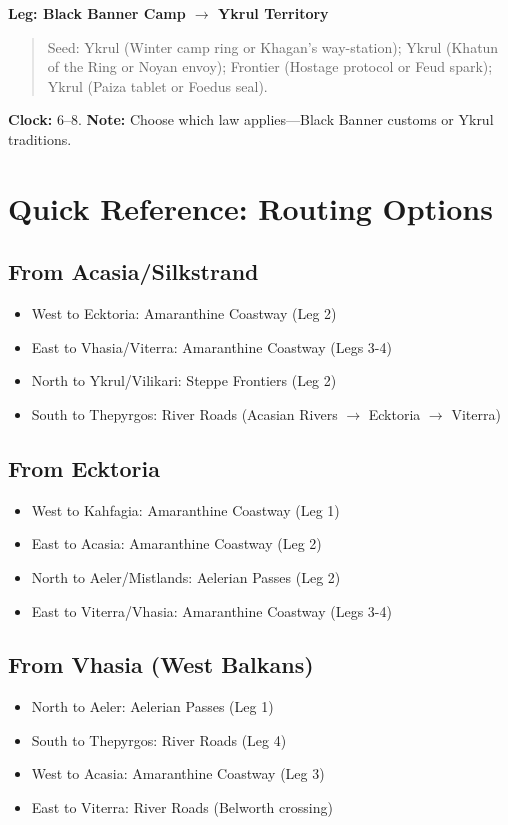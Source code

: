 \documentclass[11pt,letterpaper,twoside]{book}
\begin{document}
\textbf{Leg: Black Banner Camp $\rightarrow$ Ykrul Territory}
\begin{quote}
Seed: Ykrul \spadesuit{} (Winter camp ring or Khagan's way-station); Ykrul \heartsuit{} (Khatun of the Ring or Noyan envoy); Frontier \clubsuit{} (Hostage protocol or Feud spark); Ykrul \diamondsuit{} (Paiza tablet or Foedus seal).
\end{quote}
\textbf{Clock:} 6--8. \textbf{Note:} Choose which law applies---Black Banner customs or Ykrul traditions.

\section{Quick Reference: Routing Options}

\subsection{From Acasia/Silkstrand}
\begin{itemize}
\item West to Ecktoria: Amaranthine Coastway (Leg 2)
\item East to Vhasia/Viterra: Amaranthine Coastway (Legs 3-4)
\item North to Ykrul/Vilikari: Steppe Frontiers (Leg 2)
\item South to Thepyrgos: River Roads (Acasian Rivers $\rightarrow$ Ecktoria $\rightarrow$ Viterra)
\end{itemize}

\subsection{From Ecktoria}
\begin{itemize}
\item West to Kahfagia: Amaranthine Coastway (Leg 1)
\item East to Acasia: Amaranthine Coastway (Leg 2)
\item North to Aeler/Mistlands: Aelerian Passes (Leg 2)
\item East to Viterra/Vhasia: Amaranthine Coastway (Legs 3-4)
\end{itemize}

\subsection{From Vhasia (West Balkans)}
\begin{itemize}
\item North to Aeler: Aelerian Passes (Leg 1)
\item South to Thepyrgos: River Roads (Leg 4)
\item West to Acasia: Amaranthine Coastway (Leg 3)
\item East to Viterra: River Roads (Belworth crossing)
\end{itemize}
\end{document}
